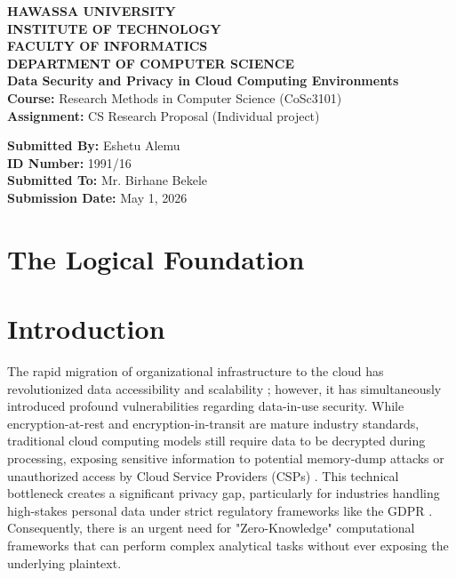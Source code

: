 \documentclass[12pt, a4paper]{article}
\begin{document}
\begin{titlepage}
    \centering
    \vspace*{1cm}
    \textbf{\Large HAWASSA UNIVERSITY}\\ 
    \textbf{\large INSTITUTE OF TECHNOLOGY}\\ 
    \textbf{\large FACULTY OF INFORMATICS}\\ 
    \textbf{\large DEPARTMENT OF COMPUTER SCIENCE}\\ 

    \vfill
    \textbf{\huge Data Security and Privacy in Cloud Computing Environments}\\
    \vspace{0.5cm}    
    \vfill
    \textbf{Course:} Research Methods in Computer Science (CoSc3101)\\ 
    \textbf{Assignment:} CS Research Proposal (Individual project)\\ 
    
    \vfill
    \begin{flushleft}
    \textbf{Submitted By:} Eshetu Alemu \\
    \textbf{ID Number:} 1991/16 \\
    \textbf{Submitted To:} Mr. Birhane Bekele \\
    \textbf{Submission Date:} May 1, 2026 
    \end{flushleft}
\end{titlepage}

\newpage

{
\hypersetup{linkcolor=black}
\tableofcontents
\newpage
\listoffigures
\listoftables
}
\newpage

\section{The Logical Foundation} 
\section{Introduction}

The rapid migration of organizational infrastructure to the cloud has revolutionized data accessibility and scalability \cite{mell2011nist}; however, it has simultaneously introduced profound vulnerabilities regarding data-in-use security. While encryption-at-rest and encryption-in-transit are mature industry standards, traditional cloud computing models still require data to be decrypted during processing, exposing sensitive information to potential memory-dump attacks or unauthorized access by Cloud Service Providers (CSPs) \cite{zhang2023cloudsecurity, fernandes2014securitycloud}. This technical bottleneck creates a significant privacy gap, particularly for industries handling high-stakes personal data under strict regulatory frameworks like the GDPR \cite{gdpr2018}. Consequently, there is an urgent need for "Zero-Knowledge" computational frameworks that can perform complex analytical tasks without ever exposing the underlying plaintext.
\end{document}
